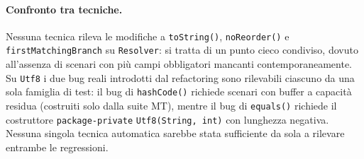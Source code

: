\paragraph{Confronto tra tecniche.}
Nessuna tecnica rileva le modifiche a \texttt{toString()},
\texttt{noReorder()} e \texttt{firstMatchingBranch} su
\texttt{Resolver}: si tratta di un punto cieco condiviso, dovuto
all'assenza di scenari con più campi obbligatori mancanti
contemporaneamente. Su \texttt{Utf8} i due bug reali introdotti dal
refactoring sono rilevabili ciascuno da una sola famiglia di test: il
bug di \texttt{hashCode()} richiede scenari con buffer a capacità
residua (costruiti solo dalla suite MT), mentre il bug di
\texttt{equals()} richiede il costruttore \texttt{package-private}
\texttt{Utf8(String,~int)} con lunghezza negativa. Nessuna singola
tecnica automatica sarebbe stata sufficiente da sola a rilevare
entrambe le regressioni.